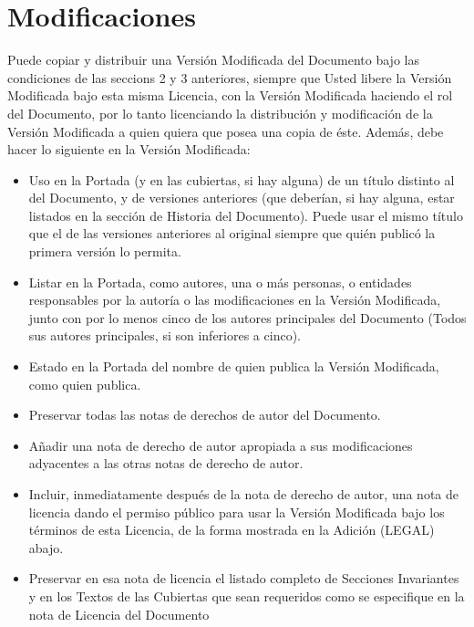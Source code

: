 \section{Modificaciones}

Puede copiar  y distribuir una  Versión Modificada del  Documento bajo
las condiciones  de las seccions 2  y 3 anteriores, siempre  que Usted
libere la Versión Modificada bajo  esta misma Licencia, con la Versión
Modificada haciendo el rol del  Documento, por lo tanto licenciando la
distribución y  modificación de la  Versión Modificada a  quien quiera
que posea  una copia de  éste. Además, debe  hacer lo siguiente  en la
Versión Modificada:

\begin{itemize}

\item Uso  en la  Portada (y en  las cubiertas, si  hay alguna)  de un
título  distinto al  del  Documento, y  de  versiones anteriores  (que
deberían, si hay alguna, estar listados  en la sección de Historia del
Documento). Puede  usar  el  mismo  título  que  el  de las  versiones
anteriores al original siempre que quién publicó la primera versión lo
permita.

\item  Listar en  la  Portada, como  autores, una  o  más personas,  o
entidades  responsables por  la  autoría o  las  modificaciones en  la
Versión  Modificada, junto  con  por  lo menos  cinco  de los  autores
principales  del  Documento (Todos  sus  autores  principales, si  son
inferiores a cinco).

\item Estado  en la  Portada del  nombre de  quien publica  la Versión
Modificada, como quien publica.

\item Preservar todas las notas de derechos de autor del Documento.

\item  Añadir   una  nota  de   derecho  de  autor  apropiada   a  sus
modificaciones adyacentes a las otras notas de derecho de autor.

\item Incluir, inmediatamente después de  la nota de derecho de autor,
una nota  de licencia dando  el permiso  público para usar  la Versión
Modificada bajo los términos de esta Licencia, de la forma mostrada en
la Adición (LEGAL) abajo.

\item  Preservar  en esa  nota  de  licencia  el listado  completo  de
Secciones  Invariantes y  en  los  Textos de  las  Cubiertas que  sean
requeridos como se especifique en la nota de Licencia del Documento


\end{itemize}
